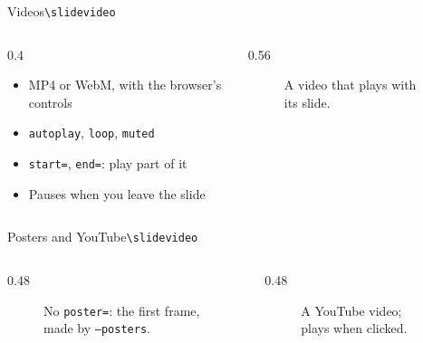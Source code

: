\begin{frame}{Videos}{\texttt{\textbackslash slidevideo}}
  \begin{columns}[c]
    \begin{column}{0.4\textwidth}
      \begin{itemize}
        \item MP4 or WebM, with the browser's controls
        \item \texttt{autoplay}, \texttt{loop}, \texttt{muted}
        \item \texttt{start=}, \texttt{end=}: play part of it
        \item Pauses when you leave the slide
      \end{itemize}
    \end{column}
    \begin{column}{0.56\textwidth}
      \begin{figure}
        \caption{A video that plays with its slide.}
      \end{figure}
    \end{column}
  \end{columns}
\end{frame}

\begin{frame}{Posters and YouTube}{\texttt{\textbackslash slidevideo}}
  \begin{columns}[c]
    \begin{column}{0.48\textwidth}
      \begin{figure}
        \caption{No \texttt{poster=}: the first frame, made by \texttt{--posters}.}
      \end{figure}
    \end{column}
    \begin{column}{0.48\textwidth}
      \begin{figure}
        \caption{A YouTube video; plays when clicked.}
      \end{figure}
    \end{column}
  \end{columns}
\end{frame}
